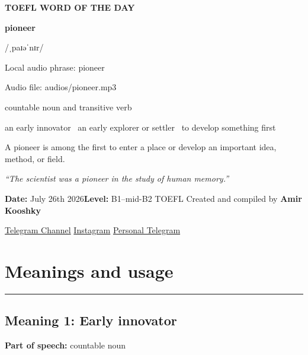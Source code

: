\documentclass[11pt]{article}
\newcommand{\sectionrule}{\par\vspace{-0.5em}\noindent\textcolor{Accent}{\rule{\linewidth}{0.6pt}}\par}
\begin{document}
\begin{center}
{\sffamily\bfseries\color{Accent} TOEFL WORD OF THE DAY\par}
\vspace{8mm}
{\fontsize{42}{48}\selectfont\bfseries pioneer\par}
\vspace{2mm}
{\Large\sffamily\color{Accent} /ˌpaɪəˈnɪr/\par}
\vspace{2mm}
{\small\sffamily Local audio phrase: pioneer\par}
{\small\sffamily Audio file: audios/pioneer.mp3\par}
\vspace{2mm}
{\large\sffamily\color{Muted} countable noun and transitive verb\par}
\vspace{5mm}
{\sffamily an early innovator \textbullet\ an early explorer or settler \textbullet\ to develop something first\par}
\vspace{6mm}
{\large A pioneer is among the first to enter a place or develop an important idea, method, or field.\par}
\vspace{6mm}
\begin{minipage}{0.84\textwidth}
\itshape “The scientist was a pioneer in the study of human memory.”
\end{minipage}\par
\vspace{10mm}
\textbf{Date:} July 26th 2026\quad\textbullet\quad \textbf{Level:} B1--mid-B2 TOEFL
\vfill
Created and compiled by \textbf{Amir Kooshky}\par
\vspace{2mm}
\href{https://t.me/KooshkyTOEFL}{Telegram Channel}\quad\textbullet\quad
\href{https://www.instagram.com/kooshkytoefl}{Instagram}\quad\textbullet\quad
\href{https://t.me/KooshkyTOEFL\_pv}{Personal Telegram}
\end{center}
\newpage
\tableofcontents
\newpage

\section{Meanings and usage}
\sectionrule
\subsection{Meaning 1: Early innovator}
\textbf{Part of speech:} countable noun
\end{document}
